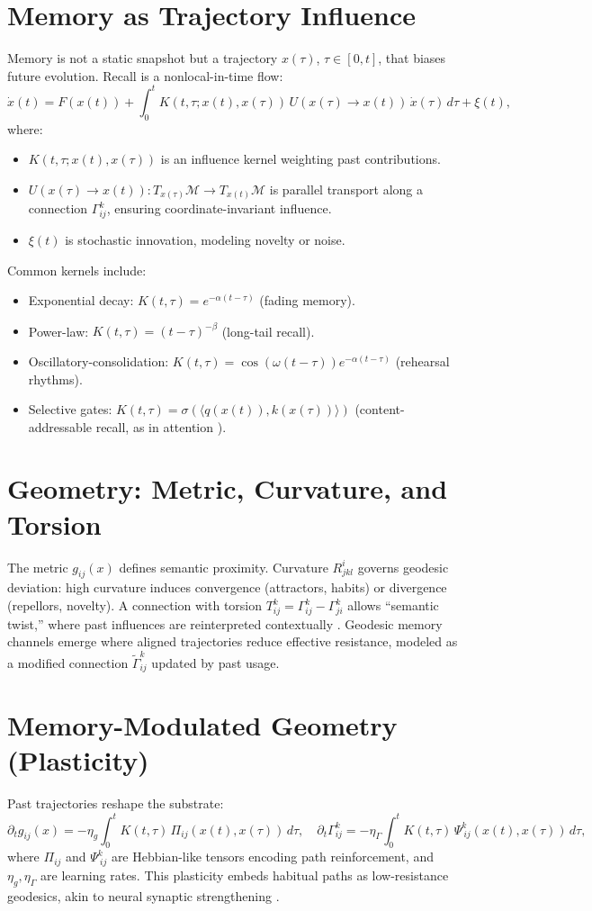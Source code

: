 \documentclass[a4paper,12pt]{article}
\newcommand{\M}{\mathcal{M}}
\begin{document}
\section{Memory as Trajectory Influence}
Memory is not a static snapshot but a trajectory $x(\tau)$, $\tau \in [0,t]$, that biases future evolution. Recall is a nonlocal-in-time flow:
\[
\dot{x}(t) = F(x(t)) + \int_0^t K(t,\tau; x(t), x(\tau)) \, U(x(\tau) \to x(t)) \, \dot{x}(\tau) \, d\tau + \xi(t),
\]
where:
\begin{itemize}
    \item $K(t,\tau; x(t), x(\tau))$ is an influence kernel weighting past contributions.
    \item $U(x(\tau) \to x(t)): T_{x(\tau)}\M \to T_{x(t)}\M$ is parallel transport along a connection $\Gamma^k_{ij}$, ensuring coordinate-invariant influence.
    \item $\xi(t)$ is stochastic innovation, modeling novelty or noise.
\end{itemize}
Common kernels include:
\begin{itemize}
    \item Exponential decay: $K(t,\tau) = e^{-\alpha (t-\tau)}$ (fading memory).
    \item Power-law: $K(t,\tau) = (t-\tau)^{-\beta}$ (long-tail recall).
    \item Oscillatory-consolidation: $K(t,\tau) = \cos(\omega (t-\tau)) e^{-\alpha (t-\tau)}$ (rehearsal rhythms).
    \item Selective gates: $K(t,\tau) = \sigma(\langle q(x(t)), k(x(\tau)) \rangle)$ (content-addressable recall, as in attention \citep{vaswani2017attention}).
\end{itemize}

\section{Geometry: Metric, Curvature, and Torsion}
The metric $g_{ij}(x)$ defines semantic proximity. Curvature $R^i_{jkl}$ governs geodesic deviation: high curvature induces convergence (attractors, habits) or divergence (repellors, novelty). A connection with torsion $T^k_{ij} = \Gamma^k_{ij} - \Gamma^k_{ji}$ allows ``semantic twist,'' where past influences are reinterpreted contextually \citep{penrose1989road}. Geodesic memory channels emerge where aligned trajectories reduce effective resistance, modeled as a modified connection $\tilde{\Gamma}^k_{ij}$ updated by past usage.

\section{Memory-Modulated Geometry (Plasticity)}
Past trajectories reshape the substrate:
\[
\partial_t g_{ij}(x) = -\eta_g \int_0^t K(t,\tau) \, \Pi_{ij}(x(t), x(\tau)) \, d\tau, \quad \partial_t \Gamma^k_{ij} = -\eta_\Gamma \int_0^t K(t,\tau) \, \Psi^k_{\ ij}(x(t), x(\tau)) \, d\tau,
\]
where $\Pi_{ij}$ and $\Psi^k_{\ ij}$ are Hebbian-like tensors encoding path reinforcement, and $\eta_g, \eta_\Gamma$ are learning rates. This plasticity embeds habitual paths as low-resistance geodesics, akin to neural synaptic strengthening \citep{hebb1949organization}.
\end{document}
